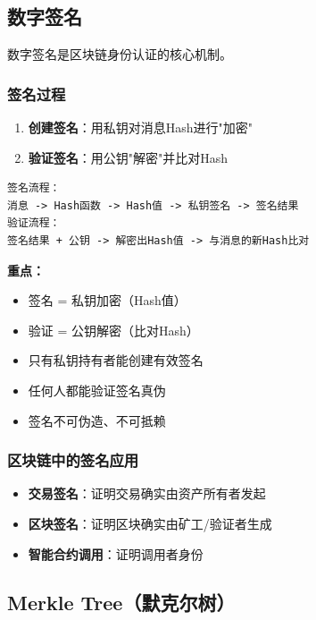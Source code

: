 ﻿\documentclass[12pt,a4paper]{article}
\begin{document}
\subsection{数字签名}

数字签名是区块链身份认证的核心机制。

\subsubsection{签名过程}

\begin{enumerate}[leftmargin=1.5em]
\item \textbf{创建签名}：用私钥对消息Hash进行"加密"
\item \textbf{验证签名}：用公钥"解密"并比对Hash
\end{enumerate}

\begin{lstlisting}
签名流程：
消息 -> Hash函数 -> Hash值 -> 私钥签名 -> 签名结果
验证流程：
签名结果 + 公钥 -> 解密出Hash值 -> 与消息的新Hash比对
\end{lstlisting}

\begin{keypointbox}
\textbf{重点：}
\begin{itemize}
\item 签名 = 私钥加密（Hash值）
\item 验证 = 公钥解密（比对Hash）
\item 只有私钥持有者能创建有效签名
\item 任何人都能验证签名真伪
\item 签名不可伪造、不可抵赖
\end{itemize}
\end{keypointbox}

\subsubsection{区块链中的签名应用}

\begin{itemize}[leftmargin=1.5em]
\item \textbf{交易签名}：证明交易确实由资产所有者发起
\item \textbf{区块签名}：证明区块确实由矿工/验证者生成
\item \textbf{智能合约调用}：证明调用者身份
\end{itemize}

\subsection{Merkle Tree（默克尔树）}
\end{document}
